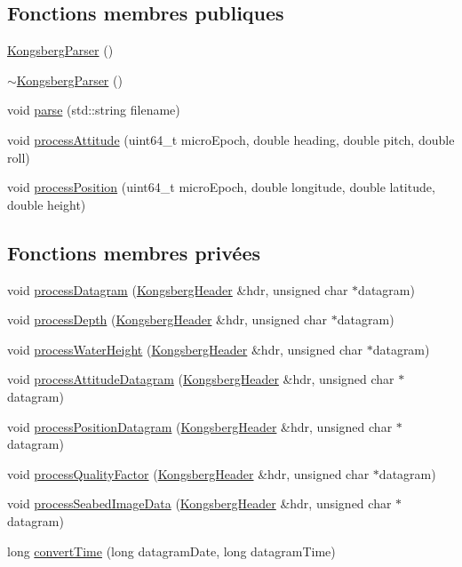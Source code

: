 \subsection*{Fonctions membres publiques}
\begin{DoxyCompactItemize}
\item 
\hyperlink{classKongsbergParser_a9a756a45d8d6ba1f83567685daf23f91}{Kongsberg\+Parser} ()
\item 
\hyperlink{classKongsbergParser_a7500ac454b264049e6f2078d914e86da}{$\sim$\+Kongsberg\+Parser} ()
\item 
void \hyperlink{classKongsbergParser_af7c31817a75fc4d153945f35f08b9d99}{parse} (std\+::string filename)
\item 
void \hyperlink{classKongsbergParser_aa241961b762eb4fed4702a337573d46d}{process\+Attitude} (uint64\+\_\+t micro\+Epoch, double heading, double pitch, double roll)
\item 
void \hyperlink{classKongsbergParser_a692580461f3e6d8f822cb84cf3ed6a3c}{process\+Position} (uint64\+\_\+t micro\+Epoch, double longitude, double latitude, double height)
\end{DoxyCompactItemize}
\subsection*{Fonctions membres privées}
\begin{DoxyCompactItemize}
\item 
void \hyperlink{classKongsbergParser_a4d2236cb102afd4eef21687f5032e7fa}{process\+Datagram} (\hyperlink{structKongsbergHeader}{Kongsberg\+Header} \&hdr, unsigned char $\ast$datagram)
\item 
void \hyperlink{classKongsbergParser_a4ece0df376ad28782f7a59d2557b42df}{process\+Depth} (\hyperlink{structKongsbergHeader}{Kongsberg\+Header} \&hdr, unsigned char $\ast$datagram)
\item 
void \hyperlink{classKongsbergParser_a9af87754001eb5c6fa6761146a78e29e}{process\+Water\+Height} (\hyperlink{structKongsbergHeader}{Kongsberg\+Header} \&hdr, unsigned char $\ast$datagram)
\item 
void \hyperlink{classKongsbergParser_a2404c01d8852893a2b93e68b2841ba66}{process\+Attitude\+Datagram} (\hyperlink{structKongsbergHeader}{Kongsberg\+Header} \&hdr, unsigned char $\ast$datagram)
\item 
void \hyperlink{classKongsbergParser_a2d81dc1b6ba8e7fd055add0009a87366}{process\+Position\+Datagram} (\hyperlink{structKongsbergHeader}{Kongsberg\+Header} \&hdr, unsigned char $\ast$datagram)
\item 
void \hyperlink{classKongsbergParser_a1edd36292b5098e2969fb3ecd0a88abb}{process\+Quality\+Factor} (\hyperlink{structKongsbergHeader}{Kongsberg\+Header} \&hdr, unsigned char $\ast$datagram)
\item 
void \hyperlink{classKongsbergParser_afa9fad0b7e76896ca18294c145353c87}{process\+Seabed\+Image\+Data} (\hyperlink{structKongsbergHeader}{Kongsberg\+Header} \&hdr, unsigned char $\ast$datagram)
\item 
long \hyperlink{classKongsbergParser_a916ac4169f44591ae5d768545f6081fc}{convert\+Time} (long datagram\+Date, long datagram\+Time)
\end{DoxyCompactItemize}


